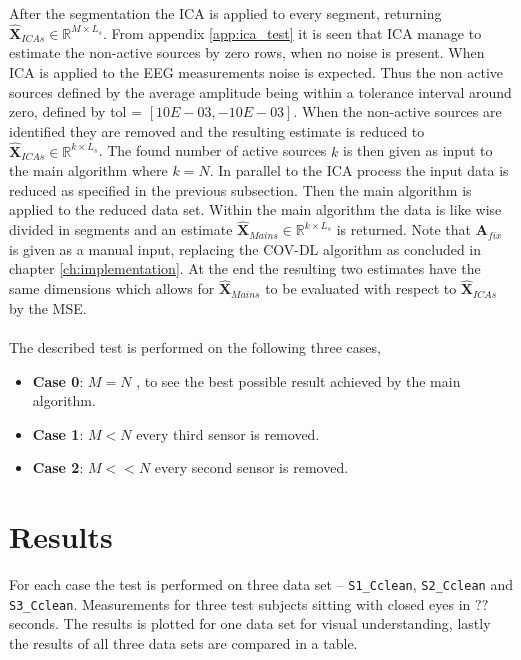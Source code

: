 After the segmentation the ICA is applied to every segment, returning $\hat{\textbf{X}}_{ICA s} \in \mathbb{R}^{M \times L_s}$.
From appendix \ref{app:ica_test} it is seen that ICA manage to estimate the non-active sources by zero rows, when no noise is present. When ICA is applied to the EEG measurements noise is expected. Thus the non active sources defined by the average amplitude being within a tolerance interval around zero, defined by tol = $[10E-03, -10E-03]$. 
When the non-active sources are identified they are removed and      
the resulting estimate is reduced to $\hat{\textbf{X}}_{ICA s} \in \mathbb{R}^{k \times L_s}$. The found number of active sources $k$ is then given as input to the main algorithm where $k = N$. 
In parallel to the ICA process the input data is reduced as specified in the previous subsection. Then the main algorithm is applied to the reduced data set. Within the main algorithm the data is like wise divided in segments and an estimate $\hat{\textbf{X}}_{Main s} \in \mathbb{R}^{k \times L_s}$ is returned. Note that $\textbf{A}_{fix}$ is given as a manual input, replacing the COV-DL algorithm as concluded in chapter \ref{ch:implementation}.
At the end the resulting two estimates have the same dimensions which allows for $\hat{\textbf{X}}_{Main s}$ to be evaluated with respect to $\hat{\textbf{X}}_{ICA s}$ by the MSE.            
\\ \\
The described test is performed on the following three cases,
\begin{itemize}
\item \textbf{Case 0}: $M = N$ , to see the best possible result achieved by the main algorithm. 
\item \textbf{Case 1}: $M < N$ every third sensor is removed. 
\item \textbf{Case 2}: $M << N$ every second sensor is removed.
\end{itemize}

\section{Results}
For each case the test is performed on three data set -- \texttt{S1\_Cclean}, \texttt{S2\_Cclean} and \texttt{S3\_Cclean}. Measurements for three test subjects sitting with closed eyes in $??$ seconds.
The results is plotted for one data set for visual understanding, lastly the results of all three data sets are compared in a table.  




